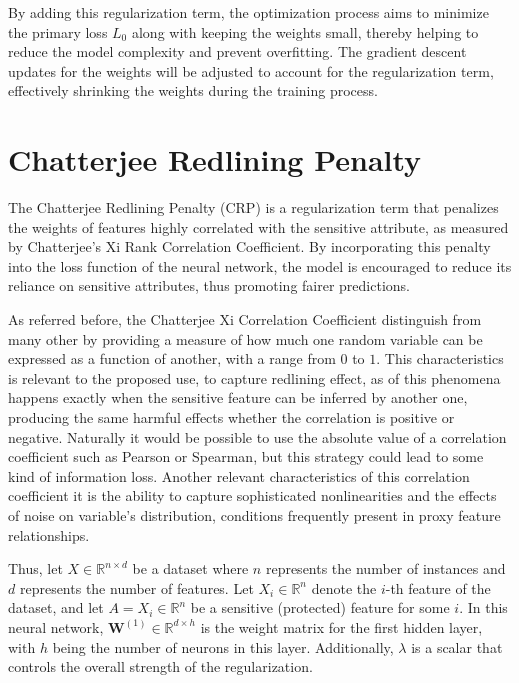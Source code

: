 By adding this regularization term, the optimization process aims to minimize the primary loss $L_0$ along with keeping the weights small, thereby helping to reduce the model complexity and prevent overfitting. The gradient descent updates for the weights will be adjusted to account for the regularization term, effectively shrinking the weights during the training process.

\section{Chatterjee Redlining Penalty}

The Chatterjee Redlining Penalty (CRP) is a regularization term that penalizes the weights of features highly correlated with the sensitive attribute, as measured by Chatterjee's Xi Rank Correlation Coefficient. By incorporating this penalty into the loss function of the neural network, the model is encouraged to reduce its reliance on sensitive attributes, thus promoting fairer predictions.

As referred before, the Chatterjee Xi Correlation Coefficient distinguish from many other by providing a measure of how much one random variable can be expressed as a function of another, with a range from $0$ to $1$. This characteristics is relevant to the proposed use, to capture redlining effect, as of this phenomena happens exactly when the sensitive feature can be inferred by another one, producing the same harmful effects whether the correlation is positive or negative. Naturally it would be possible to use the absolute value of a correlation coefficient such as Pearson or Spearman, but this strategy could lead to some kind of information loss. Another relevant characteristics of this correlation coefficient it is the ability to capture sophisticated nonlinearities and the effects of noise on variable's distribution, conditions frequently present in proxy feature relationships. 

Thus, let $X \in \mathbb{R}^{n \times d}$ be a dataset where $n$ represents the number of instances and $d$ represents the number of features. Let $X_i \in \mathbb{R}^n$ denote the $i$-th feature of the dataset, and let $A = X_i \in \mathbb{R}^n$ be a sensitive (protected) feature for some $i$. In this neural network, $\mathbf{W}^{(1)} \in \mathbb{R}^{d \times h}$ is the weight matrix for the first hidden layer, with $h$ being the number of neurons in this layer. Additionally, $\lambda$ is a scalar that controls the overall strength of the regularization.

